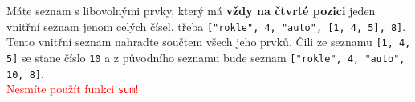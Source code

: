 \question[70]
Máte seznam s libovolnými prvky, který má \textbf{vždy na čtvrté pozici} jeden
vnitřní seznam jenom celých čísel, třeba \texttt{["rokle", 4, "auto", [1, 4, 5],
			8]}. Tento vnitřní seznam nahraďte součtem všech jeho prvků. Čili ze seznamu
\texttt{[1, 4, 5]} se stane číslo \texttt{10} a z původního seznamu bude seznam
\texttt{["rokle", 4, "auto", 10, 8]}.\\
\textcolor{red}{Nesmíte použít funkci \texttt{sum}!}